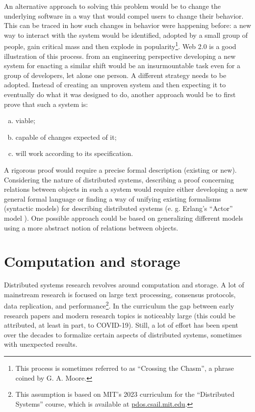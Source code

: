 \documentclass{article}
\begin{document}
An alternative approach to solving this problem would be to change the underlying
software in a way that would compel users to change their behavior. This can be traced in how
such changes in behavior were happening before: a new way to interact with the system would be
identified, adopted by a small group of people, gain critical mass and then explode in popularity\footnote{This process is sometimes referred to as “Crossing the Chasm”, a phrase coined by G. A. Moore.}.
Web 2.0 is a good illustration of this process. from an engineering perspective developing a new
system for enacting a similar shift would be an insurmountable task even for a group of developers,
let alone one person. A different strategy needs to be adopted. Instead of creating an unproven
system and then expecting it to eventually do what it was designed to do, another approach would
be to first prove that such a system is:
\begin{enumerate}[a.]
\item viable;
\item capable of changes expected of it;
\item will work according to its specification.
\end{enumerate}
A rigorous proof would require a precise formal description (existing or new). Considering
the nature of distributed systems, describing a proof concerning relations between objects in such
a system would require either developing a new general formal language or finding a way of
unifying existing formalisms (syntactic models) for describing distributed systems (e. g. Erlang’s “Actor” model \cite{Hewitt}). One possible approach could be based on generalizing different models using
a more abstract notion of relations between objects.

\section*{Computation and storage}

Distributed systems research revolves around computation and storage. A lot of mainstream
research is focused on large text processing, consensus protocols, data replication, and performance\footnote{This assumption is based on MIT’s 2023 curriculum for the “Distributed Systems” course, which is
available at \href{https://pdos.csail.mit.edu/6.824/schedule.html}{pdos.csail.mit.edu}.}.
In the curriculum the gap between early research papers and modern research topics is noticeably
large (this could be attributed, at least in part, to COVID-19). Still, a lot of effort has been spent over
the decades to formalize certain aspects of distributed systems, sometimes with unexpected results.
\end{document}
